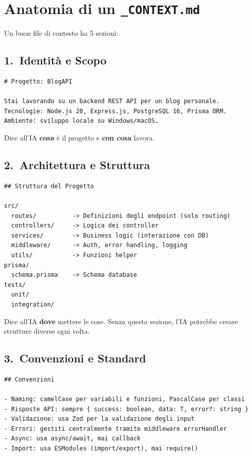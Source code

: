 \section{Anatomia di un \texttt{\_CONTEXT.md}}

Un buon file di contesto ha 5 sezioni:

\subsection{1.\ Identità e Scopo}

\begin{lstlisting}[language={}]
# Progetto: BlogAPI

Stai lavorando su un backend REST API per un blog personale.
Tecnologie: Node.js 20, Express.js, PostgreSQL 16, Prisma ORM.
Ambiente: sviluppo locale su Windows/macOS.
\end{lstlisting}

Dice all'IA \textbf{cosa} è il progetto e \textbf{con cosa} lavora.

\subsection{2.\ Architettura e Struttura}

\begin{lstlisting}[language={}]
## Struttura del Progetto

src/
  routes/          -> Definizioni degli endpoint (solo routing)
  controllers/     -> Logica dei controller
  services/        -> Business logic (interazione con DB)
  middleware/      -> Auth, error handling, logging
  utils/           -> Funzioni helper
prisma/
  schema.prisma    -> Schema database
tests/
  unit/
  integration/
\end{lstlisting}

Dice all'IA \textbf{dove} mettere le cose. Senza questa sezione, l'IA potrebbe creare strutture diverse ogni volta.

\subsection{3.\ Convenzioni e Standard}

\begin{lstlisting}[language={}]
## Convenzioni

- Naming: camelCase per variabili e funzioni, PascalCase per classi
- Risposte API: sempre { success: boolean, data: T, error?: string }
- Validazione: usa Zod per la validazione degli input
- Errori: gestiti centralmente tramite middleware errorHandler
- Async: usa async/await, mai callback
- Import: usa ESModules (import/export), mai require()
\end{lstlisting}

